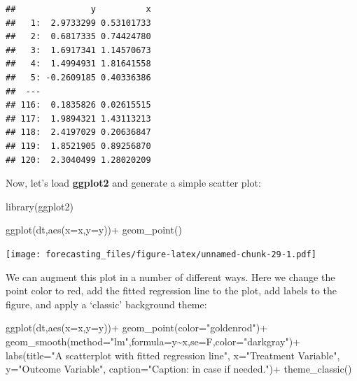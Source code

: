 \documentclass[
  12pt,
  oneside]{book}
\newenvironment{Shaded}{\begin{snugshade}}{\end{snugshade}}
\newcommand{\AttributeTok}[1]{\textcolor[rgb]{0.77,0.63,0.00}{#1}}
\newcommand{\FunctionTok}[1]{\textcolor[rgb]{0.00,0.00,0.00}{#1}}
\newcommand{\NormalTok}[1]{#1}
\newcommand{\SpecialCharTok}[1]{\textcolor[rgb]{0.00,0.00,0.00}{#1}}
\newcommand{\StringTok}[1]{\textcolor[rgb]{0.31,0.60,0.02}{#1}}
\begin{document}
\begin{verbatim}
##               y          x
##   1:  2.9733299 0.53101733
##   2:  0.6817335 0.74424780
##   3:  1.6917341 1.14570673
##   4:  1.4994931 1.81641558
##   5: -0.2609185 0.40336386
##  ---                      
## 116:  0.1835826 0.02615515
## 117:  1.9894321 1.43113213
## 118:  2.4197029 0.20636847
## 119:  1.8521905 0.89256870
## 120:  2.3040499 1.28020209
\end{verbatim}

Now, let's load \textbf{ggplot2} and generate a simple scatter plot:

\begin{Shaded}
\begin{Highlighting}[]
\FunctionTok{library}\NormalTok{(ggplot2)}

\FunctionTok{ggplot}\NormalTok{(dt,}\FunctionTok{aes}\NormalTok{(}\AttributeTok{x=}\NormalTok{x,}\AttributeTok{y=}\NormalTok{y))}\SpecialCharTok{+}
  \FunctionTok{geom\_point}\NormalTok{()}
\end{Highlighting}
\end{Shaded}

\texttt{[image: forecasting\_files/figure-latex/unnamed-chunk-29-1.pdf]}

We can augment this plot in a number of different ways. Here we change the point color to red, add the fitted regression line to the plot, add labels to the figure, and apply a `classic' background theme:

\begin{Shaded}
\begin{Highlighting}[]
\FunctionTok{ggplot}\NormalTok{(dt,}\FunctionTok{aes}\NormalTok{(}\AttributeTok{x=}\NormalTok{x,}\AttributeTok{y=}\NormalTok{y))}\SpecialCharTok{+}
  \FunctionTok{geom\_point}\NormalTok{(}\AttributeTok{color=}\StringTok{"goldenrod"}\NormalTok{)}\SpecialCharTok{+}
  \FunctionTok{geom\_smooth}\NormalTok{(}\AttributeTok{method=}\StringTok{"lm"}\NormalTok{,}\AttributeTok{formula=}\NormalTok{y}\SpecialCharTok{\textasciitilde{}}\NormalTok{x,}\AttributeTok{se=}\NormalTok{F,}\AttributeTok{color=}\StringTok{"darkgray"}\NormalTok{)}\SpecialCharTok{+}
  \FunctionTok{labs}\NormalTok{(}\AttributeTok{title=}\StringTok{"A scatterplot with fitted regression line"}\NormalTok{, }
       \AttributeTok{x=}\StringTok{"Treatment Variable"}\NormalTok{, }
       \AttributeTok{y=}\StringTok{"Outcome Variable"}\NormalTok{, }
       \AttributeTok{caption=}\StringTok{"Caption: in case if needed."}\NormalTok{)}\SpecialCharTok{+}
  \FunctionTok{theme\_classic}\NormalTok{()}
\end{Highlighting}
\end{Shaded}
\end{document}
